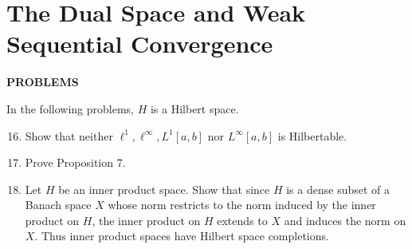 \section{The Dual Space and Weak Sequential Convergence}
\begin{center}
	\textbf{PROBLEMS}
\end{center}
In the following problems, $H$ is a Hilbert space.
\begin{enumerate}
	\setcounter{enumi}{15}
    \item Show that neither $\ell^1,\ell^\infty,L^1[a,b]$ nor $L^\infty[a,b]$ is Hilbertable.
    \item Prove Proposition 7.
    \item Let $H$ be an inner product space. Show that since $H$ is a dense subset of a Banach space $X$ whose norm restricts to the norm induced by the inner product on $H$, the inner product on $H$ extends to $X$ and induces the norm on $X$.
    Thus inner product spaces have Hilbert space completions.
\end{enumerate}

